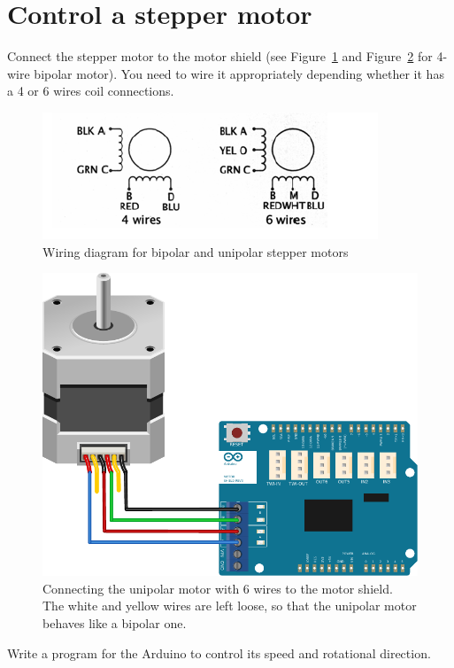 \documentclass{instructions}
\begin{document}
\part{Control a stepper motor}


Connect the stepper motor to the motor shield (see Figure~\ref{wiring} and
Figure~\ref{connection} for 4-wire bipolar motor). You need to wire it
appropriately depending whether it has a 4 or 6 wires coil connections.

\begin{figure}[h!]
    \centering
    \includegraphics[width=0.7\linewidth]{figs/wiring.png}
    \caption{Wiring diagram for bipolar and unipolar stepper motors}
    \label{wiring}
\end{figure}


\begin{figure}[h!]
    \centering
    \includegraphics[width=0.7\linewidth]{figs/unipolar-wiring}
    \caption{Connecting the unipolar motor with 6 wires to the motor
  shield. The white and yellow wires are left loose, so that the unipolar motor
    behaves like a bipolar one.}
    \label{connection}
\end{figure}



  Write a program for the Arduino to control its speed and rotational direction.

\end{document}
